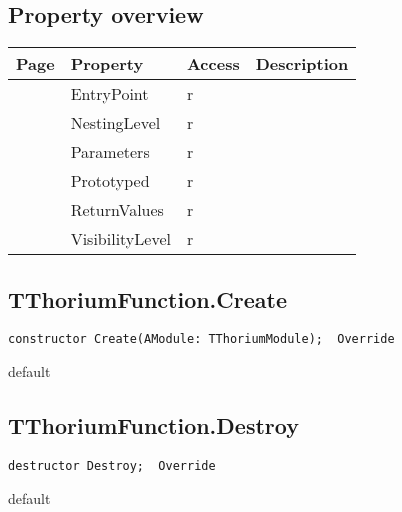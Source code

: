 \subsection{Property overview}
\label{thoriumcore:thorium:tthoriumfunction:properties}
\begin{tabularx}{\textwidth}{lllX}
Page & Property & Access & Description \\ \hline
\pageref{thoriumcore:thorium:tthoriumfunction:entrypoint} & EntryPoint & r &  \\
\pageref{thoriumcore:thorium:tthoriumfunction:nestinglevel} & NestingLevel & r &  \\
\pageref{thoriumcore:thorium:tthoriumfunction:parameters} & Parameters & r &  \\
\pageref{thoriumcore:thorium:tthoriumfunction:prototyped} & Prototyped & r &  \\
\pageref{thoriumcore:thorium:tthoriumfunction:returnvalues} & ReturnValues & r &  \\
\pageref{thoriumcore:thorium:tthoriumfunction:visibilitylevel} & VisibilityLevel & r &  \\
\hline
\end{tabularx}
\subsection{TThoriumFunction.Create}
\label{thoriumcore:thorium:tthoriumfunction:create}
\begin{FPCList}
\Synopsis
\Declaration 

\begin{verbatim}
constructor Create(AModule: TThoriumModule);  Override
\end{verbatim}
\Visibility
default
\Description
\Errors
\end{FPCList}
\subsection{TThoriumFunction.Destroy}
\label{thoriumcore:thorium:tthoriumfunction:destroy}
\begin{FPCList}
\Synopsis
\Declaration 

\begin{verbatim}
destructor Destroy;  Override
\end{verbatim}
\Visibility
default
\Description
\Errors
\end{FPCList}
